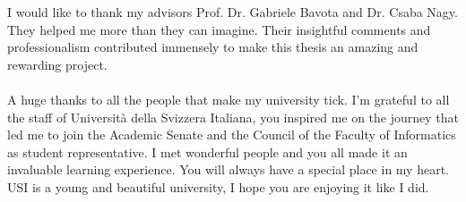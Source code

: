 \documentclass[11pt, mscthesis]{usiinfthesis}
\begin{document}
\begin{abstract}





\end{abstract}


\begin{acknowledgements}
I would like to thank my advisors Prof. Dr. Gabriele Bavota and Dr. Csaba Nagy. They helped me more than they can imagine. Their insightful comments and professionalism contributed immensely to make this thesis an amazing and rewarding project.
\\
\\
A huge thanks to all the people that make my university tick. I'm grateful to all the staff of Universit\`a della Svizzera Italiana, you inspired me on the journey that led me to join the Academic Senate and the Council of the Faculty of Informatics as student representative. I met wonderful people and you all made it an invaluable learning experience. You will always have a special place in my heart. USI is a young and beautiful university, I hope you are enjoying it like I did.



\end{acknowledgements}
\end{document}
